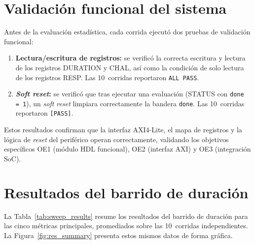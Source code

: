 \section{Validación funcional del sistema}
\label{sec:res_funcional}

Antes de la evaluación estadística, cada corrida ejecutó dos pruebas de
validación funcional:

\begin{enumerate}
  \item \textbf{Lectura/escritura de registros:} se verificó la correcta
    escritura y lectura de los registros DURATION y CHAL, así como la
    condición de solo lectura de los registros RESP. Las 10~corridas
    reportaron \texttt{ALL PASS}.

  \item \textbf{\textit{Soft reset}:} se verificó que tras ejecutar una
    evaluación (STATUS con \texttt{done\,=\,1}), un \textit{soft reset}
    limpiara correctamente la bandera \texttt{done}. Las 10~corridas
    reportaron \texttt{[PASS]}.
\end{enumerate}

Estos resultados confirman que la interfaz AXI4-Lite, el mapa de registros y
la lógica de \textit{reset} del periférico operan correctamente, validando
los objetivos específicos OE1 (módulo HDL funcional), OE2 (interfaz AXI) y
OE3 (integración SoC).

\section{Resultados del barrido de duración}
\label{sec:res_sweep}

La Tabla~\ref{tab:sweep_results} resume los resultados del barrido de
duración para las cinco métricas principales, promediados sobre las
10~corridas independientes. La Figura~\ref{fig:res_summary} presenta estos
mismos datos de forma gráfica.

